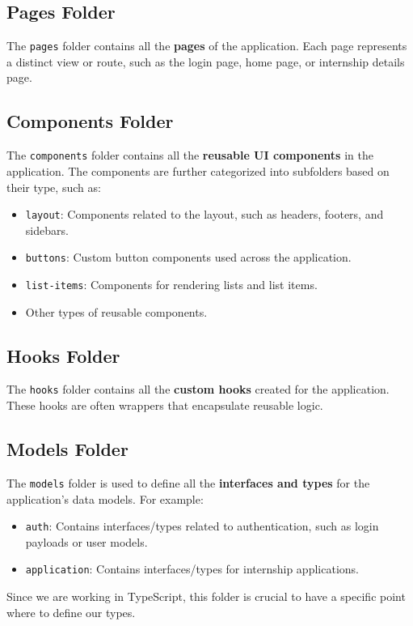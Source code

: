 \subsection{Pages Folder}
The \texttt{pages} folder contains all the \textbf{pages} of the application. Each page represents a distinct view or route, such as the login page, home page, or internship details page.

\subsection{Components Folder}
The \texttt{components} folder contains all the \textbf{reusable UI components} in the application. The components are further categorized into subfolders based on their type, such as:
\begin{itemize}
    \item \texttt{layout}: Components related to the layout, such as headers, footers, and sidebars.
    \item \texttt{buttons}: Custom button components used across the application.
    \item \texttt{list-items}: Components for rendering lists and list items.
    \item Other types of reusable components.
\end{itemize}

\subsection{Hooks Folder}
The \texttt{hooks} folder contains all the \textbf{custom hooks} created for the application. These hooks are often wrappers that encapsulate reusable logic.

\subsection{Models Folder}
The \texttt{models} folder is used to define all the \textbf{interfaces and types} for the application's data models. For example:
\begin{itemize}
    \item \texttt{auth}: Contains interfaces/types related to authentication, such as login payloads or user models.
    \item \texttt{application}: Contains interfaces/types for internship applications.
\end{itemize}
Since we are working in TypeScript, this folder is crucial to have a specific point where to define our types.


